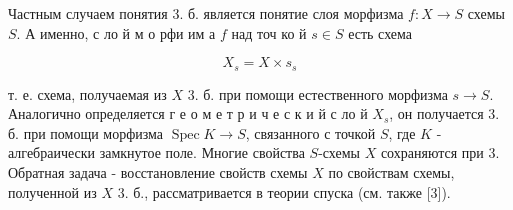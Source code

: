 \documentclass[10pt]{article}
\begin{document}
Частным случаем понятия 3. б. является понятие слоя морфизма $f: X \rightarrow S$ схемы $S$. А именно, с ло й м о рфи им а $f$ над точ ко й $s \in S$ есть схема



\[

X_{s}=X \times s_{s}

\]



т. е. схема, получаемая из $X$ 3. б. при помощи естественного морфизма $s \rightarrow S$. Аналогично определяется г е о м е т р и ч е с к и й с ло й $X_{s}$, он получается 3. б. при помощи морфизма $\operatorname{Spec} K \rightarrow S$, связанного с точкой $S$, где $K$ - алгебраически замкнутое поле. Многие свойства $S$-схемы $X$ сохраняются при 3. Обратная задача - восстановление свойств схемы $X$ по свойствам схемы, полученной из $X$ 3. б., рассматривается в теории спуска (см. также [3]).
\end{document}
